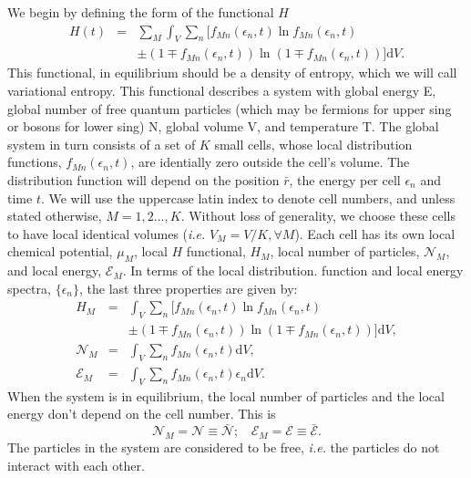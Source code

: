 \documentclass{article}
\begin{document}
We begin by defining the form of the functional $H$
\begin{eqnarray}
    H(t)&=&\sum_{M} \int_V \sum_{n} [ f_{Mn}(\epsilon_{n},t) \ln f_{Mn}(\epsilon_{n},t)\nonumber \\
    &&\pm (1 \mp f_{Mn}(\epsilon_{n},t)) \ln (1 \mp f_{Mn}(\epsilon_{n},t)) ]\mathrm{d}V \label{entropy}.
\end{eqnarray}
This functional, in equilibrium should be a density of entropy, which we will call variational entropy.
This functional describes a system with global energy E, global number of free
quantum particles (which may be fermions for upper sing or bosons for lower sing) N, global volume V, and temperature T. The
global system in turn consists of a set of $K$ small cells, whose local distribution functions, $f_{Mn}(\epsilon_{n},t)$, are
identially zero outside the cell’s volume. The distribution function will depend on the position $\bar{r}$, the energy per cell $\epsilon_{n}$ and time $t$. We will use the uppercase latin index to denote cell numbers, and unless stated otherwise, $M = 1, 2 . . . , K$. Without loss of generality, we choose these cells to have
local identical volumes (\textit{i.e.} $V_M = V/K, \forall M$). Each cell has its own local chemical potential, $\mu_M$, local
$H$ functional, $H_M$, local number of particles, $\mathcal{N}_M$, and local energy, $\mathcal{E}_M$. In terms of the local distribution.
function and local energy spectra, $\{\epsilon_{n}\}$, the last three properties are given by:
\begin{eqnarray}
    H_M&=& \int_V \sum_{n} [ f_{Mn}(\epsilon_{n},t) \ln f_{Mn}(\epsilon_{n},t)\nonumber \\
    &&\pm (1 \mp f_{Mn}(\epsilon_{n},t)) \ln (1 \mp f_{Mn}(\epsilon_{n},t)) ]\mathrm{d}V \label{entropycell},\\
    {\mathcal{N}}_M&=&\int_V \sum_{n}f_{Mn}(\epsilon_{n} ,t)\mathrm{d}V, \nonumber \\
{\mathcal{E}}_M&=&\int_V \sum_{n}f_{Mn}(\epsilon_{n},t)\epsilon_{n}\mathrm{d}V.
\end{eqnarray}
When the system is in equilibrium, the local number of particles and the local energy don't depend on the cell number. This is
\begin{equation}
   {\mathcal{N}}_M=\mathcal{N}\equiv \bar{\mathcal{N}}; \ \ \ \  {\mathcal{E}}_M=\mathcal{E}\equiv \bar{\mathcal{E}}.
\end{equation}
The particles in the system are considered to be free, \textit{i.e.} the particles do not interact with each other.
\end{document}
